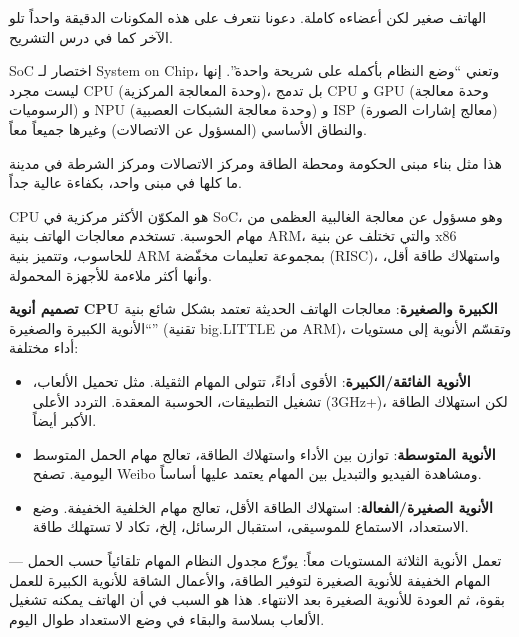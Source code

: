 


الهاتف صغير لكن أعضاءه كاملة. دعونا نتعرف على هذه المكونات الدقيقة واحداً تلو الآخر كما في درس التشريح.


SoC اختصار لـ System on Chip، وتعني “وضع النظام بأكمله على شريحة واحدة”. إنها ليست مجرد CPU (وحدة المعالجة المركزية)، بل تدمج CPU و GPU (وحدة معالجة الرسوميات) و NPU (وحدة معالجة الشبكات العصبية) و ISP (معالج إشارات الصورة) والنطاق الأساسي (المسؤول عن الاتصالات) وغيرها جميعاً معاً.

هذا مثل بناء مبنى الحكومة ومحطة الطاقة ومركز الاتصالات ومركز الشرطة في مدينة ما كلها في مبنى واحد، بكفاءة عالية جداً.


CPU هو المكوّن الأكثر مركزية في SoC، وهو مسؤول عن معالجة الغالبية العظمى من مهام الحوسبة. تستخدم معالجات الهاتف بنية ARM، والتي تختلف عن بنية x86 للحاسوب، وتتميز بنية ARM بمجموعة تعليمات مخفّضة (RISC)، واستهلاك طاقة أقل، وأنها أكثر ملاءمة للأجهزة المحمولة.

\textbf{تصميم أنوية CPU الكبيرة والصغيرة}: معالجات الهاتف الحديثة تعتمد بشكل شائع بنية “الأنوية الكبيرة والصغيرة” (تقنية big.LITTLE من ARM)، وتقسّم الأنوية إلى مستويات أداء مختلفة:

\begin{itemize}
  \item \textbf{الأنوية الفائقة/الكبيرة}: الأقوى أداءً، تتولى المهام الثقيلة. مثل تحميل الألعاب، تشغيل التطبيقات، الحوسبة المعقدة. التردد الأعلى (3GHz+)، لكن استهلاك الطاقة الأكبر أيضاً.
  \item \textbf{الأنوية المتوسطة}: توازن بين الأداء واستهلاك الطاقة، تعالج مهام الحمل المتوسط اليومية. تصفح Weibo ومشاهدة الفيديو والتبديل بين المهام يعتمد عليها أساساً.
  \item \textbf{الأنوية الصغيرة/الفعالة}: استهلاك الطاقة الأقل، تعالج مهام الخلفية الخفيفة. وضع الاستعداد، الاستماع للموسيقى، استقبال الرسائل، إلخ، تكاد لا تستهلك طاقة.
\end{itemize}

تعمل الأنوية الثلاثة المستويات معاً: يوزّع مجدول النظام المهام تلقائياً حسب الحمل — المهام الخفيفة للأنوية الصغيرة لتوفير الطاقة، والأعمال الشاقة للأنوية الكبيرة للعمل بقوة، ثم العودة للأنوية الصغيرة بعد الانتهاء. هذا هو السبب في أن الهاتف يمكنه تشغيل الألعاب بسلاسة والبقاء في وضع الاستعداد طوال اليوم.

